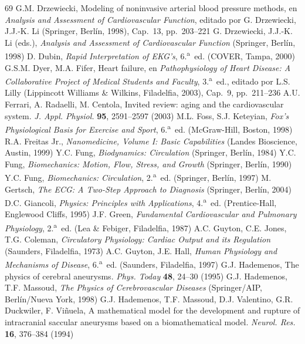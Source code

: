 \documentclass[12pt]{book}
\begin{document}
\begin{thebibliography}{69}
 G.M. Drzewiecki, Modeling of noninvasive arterial blood pressure methods, en \textit{Analysis and Assessment of Cardiovascular Function}, editado por G. Drzewiecki, J.J.-K. Li (Springer, Berlín, 1998), Cap.~13, pp.~203--221
 G. Drzewiecki, J.J.-K. Li (eds.), \textit{Analysis and Assessment of Cardiovascular Function} (Springer, Berlín, 1998)
 D. Dubin, \textit{Rapid Interpretation of EKG's}, 6.\textsuperscript{a}~ed. (COVER, Tampa, 2000)
 G.S.M. Dyer, M.A. Fifer, Heart failure, en \textit{Pathophysiology of Heart Disease: A Collaborative Project of Medical Students and Faculty}, 3.\textsuperscript{a}~ed., editado por L.S. Lilly (Lippincott Williams \& Wilkins, Filadelfia, 2003), Cap.~9, pp.~211--236
 A.U. Ferrari, A. Radaelli, M. Centola, Invited review: aging and the cardiovascular system. \textit{J. Appl. Physiol.} \textbf{95}, 2591--2597 (2003)
 M.L. Foss, S.J. Keteyian, \textit{Fox's Physiological Basis for Exercise and Sport}, 6.\textsuperscript{a}~ed. (McGraw-Hill, Boston, 1998)
 R.A. Freitas Jr., \textit{Nanomedicine, Volume I: Basic Capabilities} (Landes Bioscience, Austin, 1999)
 Y.C. Fung, \textit{Biodynamics: Circulation} (Springer, Berlín, 1984)
 Y.C. Fung, \textit{Biomechanics: Motion, Flow, Stress, and Growth} (Springer, Berlín, 1990)
 Y.C. Fung, \textit{Biomechanics: Circulation}, 2.\textsuperscript{a}~ed. (Springer, Berlín, 1997)
 M. Gertsch, \textit{The ECG: A Two-Step Approach to Diagnosis} (Springer, Berlín, 2004)
 D.C. Giancoli, \textit{Physics: Principles with Applications}, 4.\textsuperscript{a}~ed. (Prentice-Hall, Englewood Cliffs, 1995)
 J.F. Green, \textit{Fundamental Cardiovascular and Pulmonary Physiology}, 2.\textsuperscript{a}~ed. (Lea \& Febiger, Filadelfia, 1987)
 A.C. Guyton, C.E. Jones, T.G. Coleman, \textit{Circulatory Physiology: Cardiac Output and its Regulation} (Saunders, Filadelfia, 1973)
 A.C. Guyton, J.E. Hall, \textit{Human Physiology and Mechanisms of Disease}, 6.\textsuperscript{a}~ed. (Saunders, Filadelfia, 1997)
 G.J. Hademenos, The physics of cerebral aneurysms. \textit{Phys. Today} \textbf{48}, 24--30 (1995)
 G.J. Hademenos, T.F. Massoud, \textit{The Physics of Cerebrovascular Diseases} (Springer/AIP, Berlín/Nueva York, 1998)
 G.J. Hademenos, T.F. Massoud, D.J. Valentino, G.R. Duckwiler, F. Viñuela, A mathematical model for the development and rupture of intracranial saccular aneurysms based on a biomathematical model. \textit{Neurol. Res.} \textbf{16}, 376--384 (1994)

\end{thebibliography}
\end{document}
